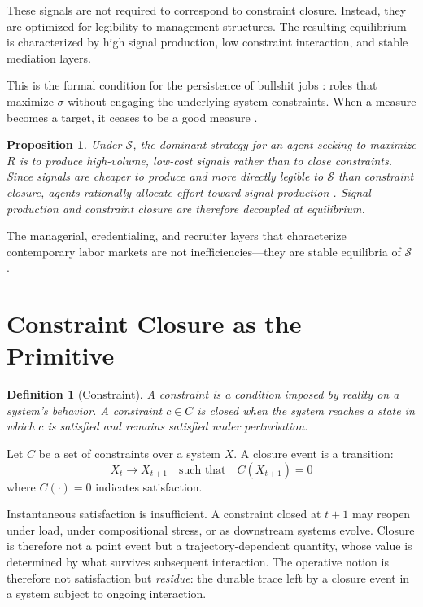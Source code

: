 \documentclass[12pt]{article}
\newtheorem{definition}{Definition}
\newtheorem{proposition}{Proposition}
\begin{document}
These signals are not required to correspond to constraint closure.
Instead, they are optimized for legibility to management structures.
The resulting equilibrium is characterized by high signal production,
low constraint interaction, and stable mediation layers.

This is the formal condition for the persistence of bullshit jobs \cite{graeber2018}: roles
that maximize $\sigma$ without engaging the underlying system
constraints. When a measure becomes a target, it ceases to be a good
measure \cite{goodhart1975,strathern1997}.

\begin{proposition}
Under $\mathcal{S}$, the dominant strategy for an agent seeking to
maximize $R$ is to produce high-volume, low-cost signals rather than to
close constraints. Since signals are cheaper to produce and more directly
legible to $\mathcal{S}$ than constraint closure, agents rationally
allocate effort toward signal production \cite{simon1955,arrow1970}.
Signal production and constraint closure are therefore decoupled at
equilibrium.
\end{proposition}

The managerial, credentialing, and recruiter layers that characterize
contemporary labor markets are not inefficiencies---they are stable
equilibria of $\mathcal{S}$ \cite{lucas1976}.

\section{Constraint Closure as the Primitive}

\begin{definition}[Constraint]
A \emph{constraint} is a condition imposed by reality on a system's
behavior. A constraint $c \in C$ is \emph{closed} when the system
reaches a state in which $c$ is satisfied and remains satisfied under
perturbation.
\end{definition}

Let $C$ be a set of constraints over a system $X$. A closure event is a
transition:
\[
  X_t \rightarrow X_{t+1} \quad \text{such that} \quad C(X_{t+1}) = 0
\]
where $C(\cdot) = 0$ indicates satisfaction.

Instantaneous satisfaction is insufficient. A constraint closed at
$t+1$ may reopen under load, under compositional stress, or as
downstream systems evolve. Closure is therefore not a point event but a
trajectory-dependent quantity, whose value is determined by what
survives subsequent interaction. The operative notion is therefore not
satisfaction but \emph{residue}: the durable trace left by a closure
event in a system subject to ongoing interaction.
\end{document}
